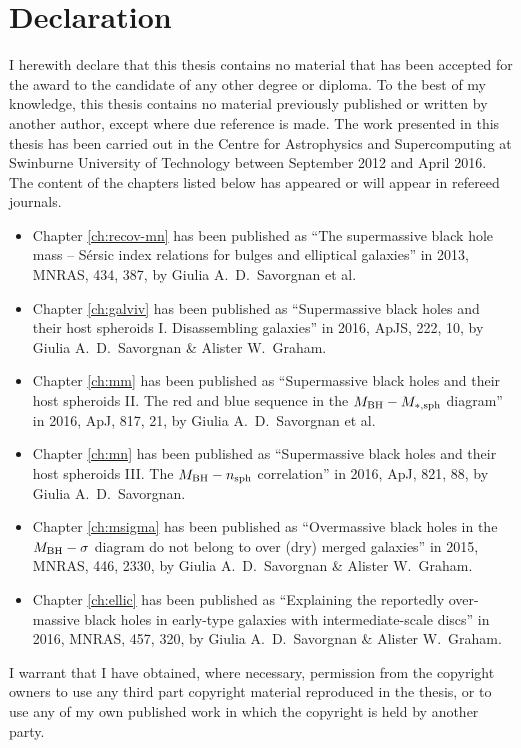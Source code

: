 \chapter*{Declaration}

I herewith declare that this thesis contains no material that has been accepted 
for the award to the candidate of any other degree or diploma. 
To the best of my knowledge, 
this thesis contains no material previously published or written by another author, 
except where due reference is made.
The work presented in this thesis has been carried out 
in the Centre for Astrophysics and Supercomputing 
at Swinburne University of Technology between September 2012 and April 2016. 
The content of the chapters listed below has appeared or will appear in refereed journals. 

\begin{itemize}

\item Chapter \ref{ch:recov-mn} has been published as 
``The supermassive black hole mass -- S\'ersic index relations for bulges and elliptical galaxies''
in 2013, MNRAS, 434, 387, by Giulia A.~D.~Savorgnan et al.

\item Chapter \ref{ch:galviv} has been published as 
``Supermassive black holes and their host spheroids I. Disassembling galaxies'' 
in 2016, ApJS, 222, 10, by Giulia A.~D.~Savorgnan \& Alister W.~Graham. 

\item Chapter \ref{ch:mm} has been published as 
``Supermassive black holes and their host spheroids 
II. The red and blue sequence in the $M_{\rm BH} - M_{\rm *,sph}$ diagram''
in 2016, ApJ, 817, 21, by Giulia A.~D.~Savorgnan et al.

\item Chapter \ref{ch:mn} has been published as 
``Supermassive black holes and their host spheroids 
III. The $M_{\rm BH} - n_{\rm sph}$ correlation''
in 2016, ApJ, 821, 88, by Giulia A.~D.~Savorgnan.

\item Chapter \ref{ch:msigma} has been published as 
``Overmassive black holes in the $M_{\rm BH} - \sigma$ diagram do not belong to over (dry) merged galaxies''
in 2015, MNRAS, 446, 2330, by Giulia A.~D.~Savorgnan \& Alister W.~Graham. 

\item Chapter \ref{ch:ellic} has been published as 
``Explaining the reportedly over-massive black holes in early-type galaxies with intermediate-scale discs'' 
in 2016, MNRAS, 457, 320, by Giulia A.~D.~Savorgnan \& Alister W.~Graham. 

\end{itemize}

I warrant that I have obtained, where necessary, permission from the copyright owners to use 
any third part copyright material reproduced in the thesis, 
or to use any of my own published work in which the copyright 
is held by another party.
